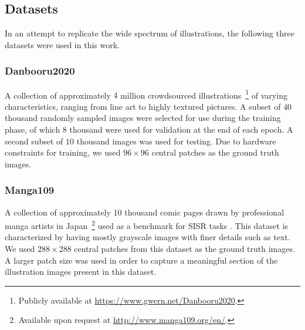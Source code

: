 



\subsection{Datasets}
\label{section:datasets}


In an attempt to replicate the wide spectrum of illustrations, the following three datasets were used in this work.

\subsubsection{Danbooru2020}

A collection of approximately $4$ million crowdsourced illustrations~\cite{danbooru2020}\footnote{Publicly available at \url{https://www.gwern.net/Danbooru2020}.} of varying characteristics, ranging from line art to highly textured pictures. A subset of $40$ thousand randomly sampled images were selected for use during the training phase, of which $8$ thousand were used for validation at the end of each epoch. A second subset of $10$ thousand images was used for testing. Due to hardware constraints for training, we used ${96\times96}$ central patches as the ground truth images.

\subsubsection{Manga109}
\label{subsection:manga109}

A collection of approximately 10 thousand comic pages drawn by professional manga artists in Japan~\cite{mtap_matsui_2017,multimedia_aizawa_2020}\footnote{Available upon request at \url{http://www.manga109.org/en/}.} used as a benchmark for SISR tasks \cite{haris2018deep,zhang2018residual}. This dataset is characterized by having mostly grayscale images with finer details such as text. We used ${288\times288}$ central patches from this dataset as the ground truth images. A larger patch size was used in order to capture a meaningful section of the illustration images present in this dataset.

